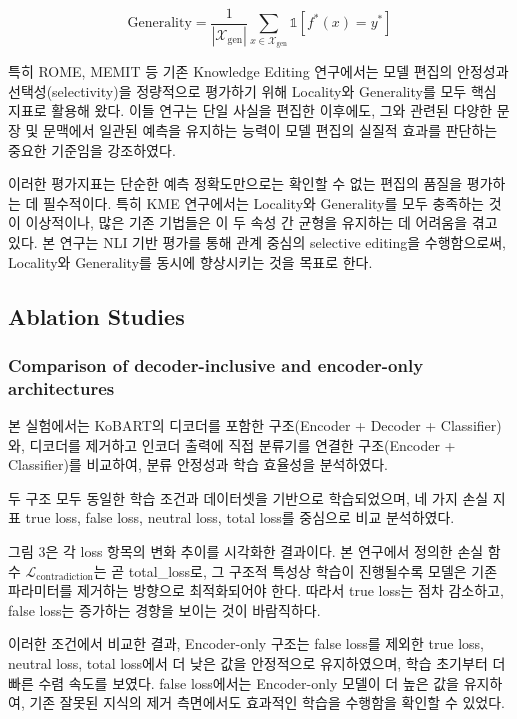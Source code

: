 \documentclass[a4paper,fleqn]{cas-sc}
\begin{document}
\begin{equation}
\text{Generality} = \frac{1}{\left| \mathcal{X}_{\text{gen}} \right|} \sum_{x \in \mathcal{X}_{\text{gen}}} \mathbb{1} \left[ f^*(x) = y^* \right]
\end{equation}


특히 ROME, MEMIT 등 기존 Knowledge Editing 연구에서는 모델 편집의 안정성과 선택성(selectivity)을 정량적으로 평가하기 위해 Locality와 Generality를 모두 핵심 지표로 활용해 왔다.
이들 연구는 단일 사실을 편집한 이후에도, 그와 관련된 다양한 문장 및 문맥에서 일관된 예측을 유지하는 능력이 모델 편집의 실질적 효과를 판단하는 중요한 기준임을 강조하였다.

이러한 평가지표는 단순한 예측 정확도만으로는 확인할 수 없는 편집의 품질을 평가하는 데 필수적이다.  
특히 KME 연구에서는 Locality와 Generality를 모두 충족하는 것이 이상적이나, 많은 기존 기법들은 이 두 속성 간 균형을 유지하는 데 어려움을 겪고 있다.  
본 연구는 NLI 기반 평가를 통해 관계 중심의 selective editing을 수행함으로써, Locality와 Generality를 동시에 향상시키는 것을 목표로 한다.



\subsection{Ablation Studies}

\subsubsection{Comparison of decoder-inclusive and encoder-only architectures}

본 실험에서는 KoBART의 디코더를 포함한 구조(Encoder + Decoder + Classifier)와, 디코더를 제거하고 인코더 출력에 직접 분류기를 연결한 구조(Encoder + Classifier)를 비교하여, 분류 안정성과 학습 효율성을 분석하였다.

두 구조 모두 동일한 학습 조건과 데이터셋을 기반으로 학습되었으며, 네 가지 손실 지표 true loss, false loss, neutral loss, total loss를 중심으로 비교 분석하였다.  

그림 3은 각 loss 항목의 변화 추이를 시각화한 결과이다.  
본 연구에서 정의한 손실 함수 \( \mathcal{L}_{\text{contradiction}} \)는 곧 total\_loss로, 그 구조적 특성상 학습이 진행될수록 모델은 기존 파라미터를 제거하는 방향으로 최적화되어야 한다.  
따라서 true loss는 점차 감소하고, false loss는 증가하는 경향을 보이는 것이 바람직하다.

이러한 조건에서 비교한 결과, Encoder-only 구조는 false loss를 제외한 true loss, neutral loss, total loss에서 더 낮은 값을 안정적으로 유지하였으며, 학습 초기부터 더 빠른 수렴 속도를 보였다. 
false loss에서는 Encoder-only 모델이 더 높은 값을 유지하여, 기존 잘못된 지식의 제거 측면에서도 효과적인 학습을 수행함을 확인할 수 있었다.
\end{document}
